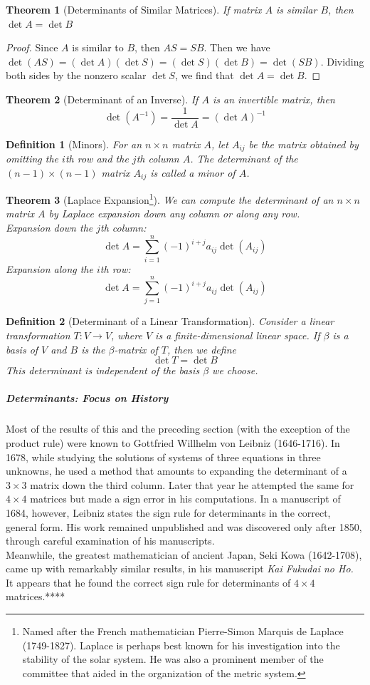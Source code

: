 \documentclass[10pt]{report}
\newtheorem{thm2}{Theorem}[section]
\newtheorem{def2}{Definition}[section]
\begin{document}
\begin{thm2}[Determinants of Similar Matrices]
If matrix $A$ is similar $B$, then $\det A = \det B$
\end{thm2}
\begin{proof}
Since $A$ is similar to $B$, then $AS=SB$. Then we have $\det(AS) = (\det A)(\det S) = (\det S)(\det B) =\det(SB)$. Dividing both sides by the nonzero scalar $\det S$, we find that $\det A = \det B$.
\end{proof}
\begin{thm2}[Determinant of an Inverse]
If $A$ is an invertible matrix, then
$$\det(A^{-1})=\frac{1}{\det A} = (\det A)^{-1}$$
\end{thm2}
\begin{def2}[Minors]
For an $n\times n$ matrix $A$, let $A_{ij}$ be the matrix obtained by omitting the $i$th row and the $j$th column $A$. The determinant of the $(n-1)\times (n-1)$ matrix $A_{ij}$ is called a minor of $A$.
\end{def2}
\begin{thm2}[Laplace Expansion\footnote{Named after the French mathematician Pierre-Simon Marquis de Laplace (1749-1827). Laplace is perhaps best known for his investigation into the stability of the solar system. He was also a prominent member of the committee that aided in the organization of the metric system.}]
We can compute the determinant of an $n\times n$ matrix $A$ by Laplace expansion down any column or along any row.\\
Expansion down the $j$th column:
$$\det A = \sum_{i=1}^n(-1)^{i+j}a_{ij} \det(A_{ij})$$
Expansion along the $i$th row:
$$\det A = \sum_{j=1}^n(-1)^{i+j}a_{ij} \det(A_{ij})$$
\end{thm2}
\begin{def2}[Determinant of a Linear Transformation]
Consider a linear transformation $T:V\to V$, where $V$ is a finite-dimensional linear space. If $\beta$ is a basis of $V$ and $B$ is the $\beta$-matrix of $T$, then we define
$$\det T = \det B$$
This determinant is independent of the basis $\beta$ we choose.
\end{def2}
\subparagraph{Determinants: Focus on History}
Most of the results of this and the preceding section (with the exception of the product rule) were known to Gottfried Willhelm von Leibniz (1646-1716). In 1678, while studying the solutions of systems of three equations in three unknowns, he used a method that amounts to expanding the determinant of a $3\times 3$ matrix down the third column. Later that year he attempted the same for $4\times 4$ matrices but made a sign error in his computations. In a manuscript of 1684, however, Leibniz states the sign rule for determinants in the correct, general form. His work remained unpublished and was discovered only after 1850, through careful examination of his manuscripts.\\
Meanwhile, the greatest mathematician of ancient Japan, Seki Kowa (1642-1708), came up with remarkably similar results, in his manuscript \textit{Kai Fukudai no Ho.} It appears that he found the correct sign rule for determinants of $4\times 4$ matrices.****
\end{document}
